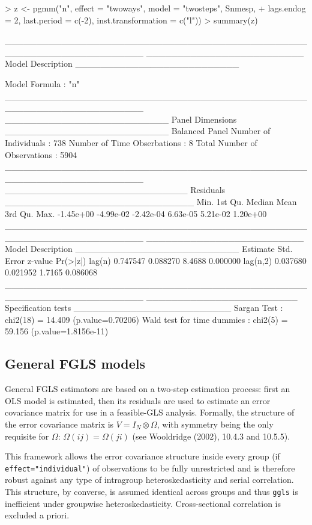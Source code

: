 \documentclass{article}
\begin{document}
\begin{Schunk}
\begin{Sinput}
> z <- pgmm("n", effect = "twoways", model = "twosteps", Snmesp, 
+     lags.endog = 2, last.period = c(-2), inst.transformation = c("l"))
> summary(z)
\end{Sinput}
\begin{Soutput}
______________________________________________________________________ 
_________________________ Model Description __________________________


Model Formula             : "n"
______________________________________________________________________ 
__________________________ Panel Dimensions __________________________
Balanced Panel
Number of Individuals        :  738
Number of Time Obserbations  :  8
Total Number of Observations :  5904
______________________________________________________________________ 
_____________________________ Residuals ______________________________
     Min.   1st Qu.    Median      Mean   3rd Qu.      Max. 
-1.45e+00 -4.99e-02 -2.42e-04  6.63e-05  5.21e-02  1.20e+00 
______________________________________________________________________ 
_________________________ Model Description __________________________
         Estimate Std. Error z-value Pr(>|z|)
lag(n)   0.747547   0.088270  8.4688 0.000000
lag(n,2) 0.037680   0.021952  1.7165 0.086068
______________________________________________________________________ 
________________________ Specification tests _________________________
Sargan Test                   : chi2(18) = 14.409 (p.value=0.70206)
Wald test for time dummies    : chi2(5) = 59.156 (p.value=1.8156e-11)
\end{Soutput}
\end{Schunk}

\subsection{General FGLS models}
General FGLS estimators are based on a two-step estimation process: first an OLS model is estimated, then its residuals are used to estimate an error covariance matrix for use in a feasible-GLS analysis. Formally, the structure of the error covariance matrix is $ V=I_N \otimes \Omega $, with symmetry being the only requisite for $\Omega$: $ \Omega(ij)=\Omega(ji) $ (see Wooldridge (2002), 10.4.3 and 10.5.5).

This framework allows the error covariance structure inside every group (if \texttt{effect="individual"}) of observations to be fully unrestricted and is therefore robust against any type of intragroup heteroskedasticity and serial correlation. This structure, by converse, is assumed identical across groups and thus \texttt{ggls} is inefficient under groupwise heteroskedasticity. Cross-sectional correlation is excluded a priori.
\end{document}
